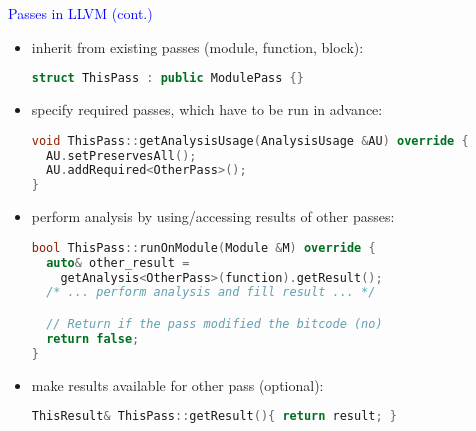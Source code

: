 \begin{frame}[fragile]{\textcolor{blue}{Passes in LLVM (cont.)}}
\underline{}
\begin{itemize}
\item inherit from existing passes (module, function, block):
\begin{footnotesize}
\begin{lstlisting}[language=C++]
struct ThisPass : public ModulePass {}
\end{lstlisting}
\end{footnotesize}

\item specify required passes, which have to be run in advance:
\begin{footnotesize}
\begin{lstlisting}[language=C++]
void ThisPass::getAnalysisUsage(AnalysisUsage &AU) override {
  AU.setPreservesAll();
  AU.addRequired<OtherPass>();
}
\end{lstlisting}
\end{footnotesize}

\item perform analysis by using/accessing results of other passes:
\begin{footnotesize}
\begin{lstlisting}[language=C++]
bool ThisPass::runOnModule(Module &M) override {
  auto& other_result =
    getAnalysis<OtherPass>(function).getResult();
  /* ... perform analysis and fill result ... */

  // Return if the pass modified the bitcode (no)
  return false;
}
\end{lstlisting}
\end{footnotesize}

\item make results available for other pass (optional):
\begin{footnotesize}
\begin{lstlisting}[language=C++]
ThisResult& ThisPass::getResult(){ return result; }
\end{lstlisting}
\end{footnotesize}

\end{itemize}

\end{frame}


